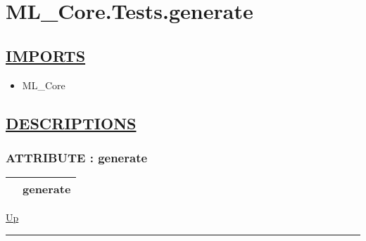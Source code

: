 \chapter*{ML\_Core.Tests.generate}
\hypertarget{ecldoc:toc:ML_Core.Tests.generate}{}

\section*{\underline{IMPORTS}}
\begin{itemize}
\item ML\_Core
\end{itemize}

\section*{\underline{DESCRIPTIONS}}
\subsection*{ATTRIBUTE : generate}
\hypertarget{ecldoc:ml_core.tests.generate}{}

{\renewcommand{\arraystretch}{1.5}
\begin{tabularx}{\textwidth}{|>{\raggedright\arraybackslash}l|X|}
\hline
\hspace{0pt} & generate \\
\hline
\end{tabularx}
}

\hyperlink{ecldoc:toc:ML_Core/Tests}{Up}

\par


\rule{\textwidth}{0.4pt}
